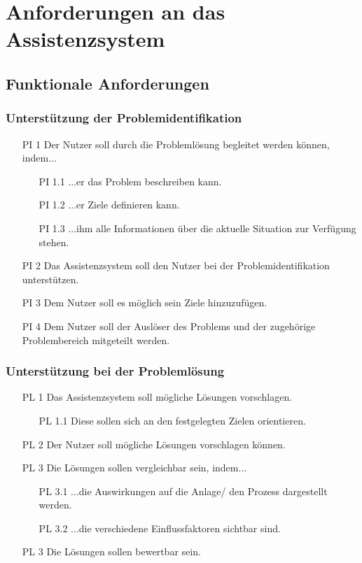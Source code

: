 \section{Anforderungen an das Assistenzsystem}

\subsection{Funktionale Anforderungen}

\subsubsection*{Unterstützung der Problemidentifikation}
\begin{itemize}
\item[PI 1] Der Nutzer soll durch die Problemlösung begleitet werden können, indem...
	\begin{itemize}
	\item[PI 1.1] ...er das Problem beschreiben kann.
	\item [PI 1.2] ...er Ziele definieren kann.
	\item[PI 1.3] ...ihm alle Informationen über die aktuelle Situation zur Verfügung stehen.
	\end{itemize}
\item[PI 2] Das Assistenzsystem soll den Nutzer bei der Problemidentifikation unterstützen.
\item[PI 3] Dem Nutzer soll es möglich sein Ziele hinzuzufügen.
\item[PI 4] Dem Nutzer soll der Auslöser des Problems und der zugehörige Problembereich mitgeteilt werden.
\end{itemize}

\subsubsection*{Unterstützung bei der Problemlösung}
\begin{itemize}
\item[PL 1] Das Assistenzsystem soll mögliche Lösungen vorschlagen.
	\begin{itemize}
	\item[PL 1.1] Diese sollen sich an den festgelegten Zielen orientieren.
	\end{itemize}
\item[PL 2] Der Nutzer soll mögliche Lösungen vorschlagen können.
\item[PL 3] Die Lösungen sollen vergleichbar sein, indem...
	\begin{itemize}
	\item[PL 3.1] ...die Auswirkungen auf die Anlage/ den Prozess dargestellt werden.
	\item[PL 3.2] ...die verschiedene Einflussfaktoren sichtbar sind.
	\end{itemize}
\item[PL 3] Die Lösungen sollen bewertbar sein.
\end{itemize}

